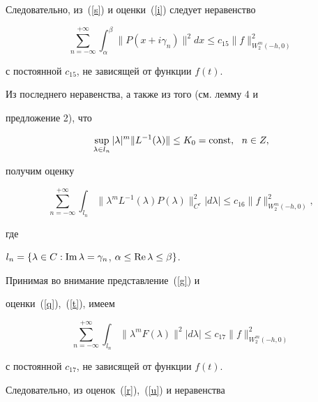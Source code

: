 Следовательно, из~(\ref{s}) и оценки~(\ref{i}) следует неравенство


$$


\sum\limits_{n=-\infty}^{+\infty}\int_{\alpha}^{\beta}


\|P(x+i\gamma_n)\|^2dx\le c_{15}\|f\|_{W_2^m(-h,0)}^2


$$


с постоянной $c_{15}$, не зависящей от функции $f(t)$.





Из последнего неравенства, а также из того (см. лемму 4 и


предложение 2), что


$$


\sup\limits_{\lambda\in l_n}|\lambda|^m\|L^{-1}(\lambda)\|\le K_0=\const,


\ \ n\in Z,


$$


получим оценку


\begin{equation}


\label{t}


\sum\limits_{n=-\infty}^{+\infty}\int_{l_n}\|\lambda^mL^{-1}(\lambda)


P(\lambda)\|_{C^r}^2|d\lambda|\le c_{16}\|f\|_{W_2^m(-h,0)}^2,


\end{equation}


где


$l_n=\{\lambda\in C:\operatorname{Im}\lambda=\gamma_n$, $\alpha\le \operatorname{Re}\lambda\le\beta\}$.





Принимая во внимание представление~(\ref{g}) и


оценки~(\ref{q}),~(\ref{t}), имеем


\begin{equation}


\label{u}


\sum\limits_{n=-\infty}^{+\infty}\int_{l_n}


\|\lambda^mF(\lambda)\|^2|d\lambda|\le c_{17}\|f\|_{W_2^m(-h,0)}^2


\end{equation}


с постоянной $c_{17}$, не зависящей от функции $f(t)$.





Следовательно, из оценок~(\ref{r}),~(\ref{u}) и неравенства


